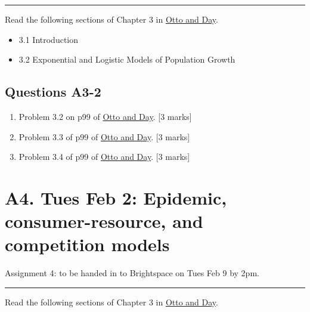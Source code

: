 \documentclass[]{book}
\providecommand{\tightlist}{%
  \setlength{\itemsep}{0pt}\setlength{\parskip}{0pt}}
\begin{document}
\begin{center}\rule{0.5\linewidth}{0.5pt}\end{center}

Read the following sections of Chapter 3 in
\href{https://ebookcentral-proquest-com.qe2a-proxy.mun.ca/lib/mun/reader.action?docID=768551\&ppg=66}{Otto
and Day}.

\begin{itemize}
\tightlist
\item
  3.1 Introduction
\item
  3.2 Exponential and Logistic Models of Population Growth
\end{itemize}

\section{Questions A3-2}\label{questions-a3-2}

\begin{enumerate}
\def\labelenumi{\arabic{enumi}.}
\setcounter{enumi}{3}
\item
  Problem 3.2 on p99 of
  \href{https://ebookcentral-proquest-com.qe2a-proxy.mun.ca/lib/mun/reader.action?docID=768551\&ppg=99}{Otto
  and Day}. {[}3 marks{]}
\item
  Problem 3.3 of p99 of
  \href{https://ebookcentral-proquest-com.qe2a-proxy.mun.ca/lib/mun/reader.action?docID=768551\&ppg=99}{Otto
  and Day}. {[}3 marks{]}
\item
  Problem 3.4 of p99 of
  \href{https://ebookcentral-proquest-com.qe2a-proxy.mun.ca/lib/mun/reader.action?docID=768551\&ppg=99}{Otto
  and Day}. {[}3 marks{]}
\end{enumerate}

\chapter{A4. Tues Feb 2: Epidemic, consumer-resource, and competition
models}\label{a4.-tues-feb-2-epidemic-consumer-resource-and-competition-models}

Assignment 4: to be handed in to Brightspace on Tues Feb 9 by 2pm.

\begin{center}\rule{0.5\linewidth}{0.5pt}\end{center}

Read the following sections of Chapter 3 in
\href{https://ebookcentral-proquest-com.qe2a-proxy.mun.ca/lib/mun/reader.action?docID=768551\&ppg=87}{Otto
and Day}.
\end{document}
